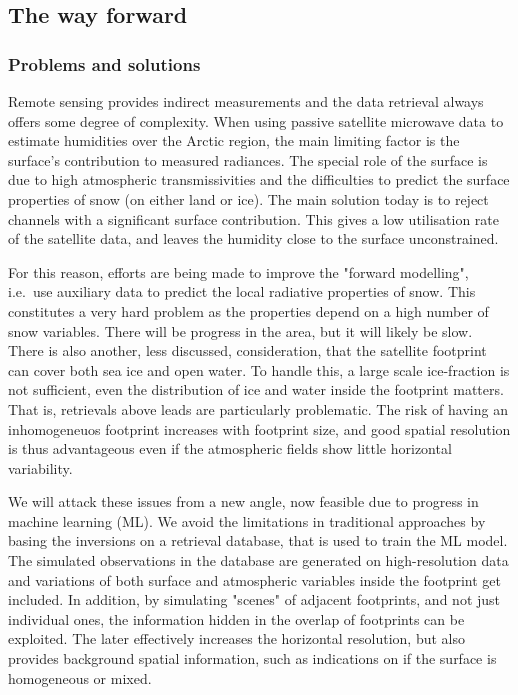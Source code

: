 \documentclass[12pt,oneside,a4paper]{article}
\begin{document}
\subsection{The way forward}

\subsubsection{Problems and solutions}

Remote sensing provides indirect measurements and the data retrieval always
offers some degree of complexity. When using passive satellite microwave data
to estimate humidities over the Arctic region, the main limiting factor is the
surface's contribution to measured radiances. The special role of the surface
is due to high atmospheric transmissivities and the difficulties to predict the
surface properties of snow (on either land or ice). The main solution today is
to reject channels with a significant surface contribution. This gives a low
utilisation rate of the satellite data, and leaves the humidity close to the
surface unconstrained.

For this reason, efforts are being made to improve the "forward modelling",
i.e.\ use auxiliary data to predict the local radiative properties of snow. This
constitutes a very hard problem as the properties depend on a high number of
snow variables. There will be progress in the area, but it will likely be slow.
There is also another, less discussed, consideration, that the satellite
footprint can cover both sea ice and open water. To handle this, a large scale
ice-fraction is not sufficient, even the distribution of ice and water inside
the footprint matters. That is, retrievals above leads are particularly
problematic. The risk of having an inhomogeneuos footprint increases with
footprint size, and good spatial resolution is thus advantageous even if the
atmospheric fields show little horizontal variability.

We will attack these issues from a new angle, now feasible due to progress in
machine learning (ML). We avoid the limitations in traditional approaches by
basing the inversions on a retrieval database, that is used to train the ML
model. The simulated observations in the database are generated on
high-resolution data and variations of both surface and atmospheric variables
inside the footprint get included. In addition, by simulating "scenes" of
adjacent footprints, and not just individual ones, the information hidden in
the overlap of footprints can be exploited. The later effectively increases the
horizontal resolution, but also provides background spatial information, such
as indications on if the surface is homogeneous or mixed.
\end{document}
